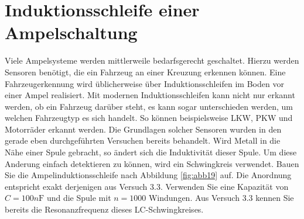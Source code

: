 \documentclass[10pt]{report}
\begin{document}
        \section{Induktionsschleife einer Ampelschaltung}
        Viele Ampelsysteme werden mittlerweile bedarfsgerecht geschaltet. Hierzu werden Sensoren
        benötigt, die ein Fahrzeug an einer Kreuzung erkennen können. Eine Fahrzeugerkennung
        wird üblicherweise über Induktionsschleifen im Boden vor einer Ampel realisiert. Mit
        modernen Induktionsschleifen kann nicht nur erkannt werden, ob ein Fahrzeug darüber
        steht, es kann sogar unterschieden werden, um welchen Fahrzeugtyp es sich handelt. So
        können beispielsweise LKW, PKW und Motorräder erkannt werden.
        Die Grundlagen solcher Sensoren wurden in den gerade eben durchgeführten Versuchen
        bereits behandelt. Wird Metall in die Nähe einer Spule gebracht, so ändert sich die
        Induktivität dieser Spule. Um diese Anderung einfach detektieren zu können, wird ein
        Schwingkreis verwendet.
        Bauen Sie die Ampelinduktionsschleife nach Abbildung \ref{fig:abb19} auf. Die Anordnung entspricht
        exakt derjenigen aus Versuch 3.3. Verwenden Sie eine Kapazität von $C = 100\si{n\farad}$ und die
        Spule mit $n = 1000$ Windungen. Aus Versuch 3.3 kennen Sie bereits die Resonanzfrequenz
        dieses LC-Schwingkreises.
\end{document}
